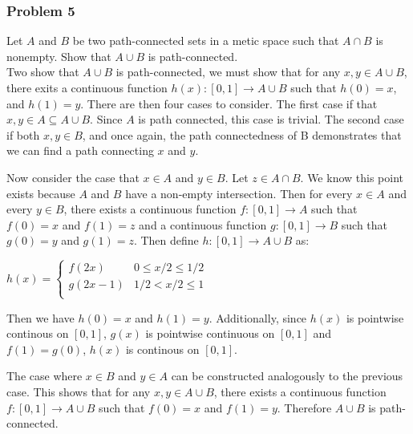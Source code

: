 \documentclass[10pt,a4paper]{article}
\begin{document}
\subsubsection{Problem 5}
Let $A$ and $B$ be two path-connected sets in a metic space such that $A \cap B$ is nonempty. Show that $A \cup B$ is path-connected.\\

Two show that $A \cup B$ is path-connected, we must show that for any $x, y \in A \cup B$, there exits a continuous function $h(x): [0, 1] \rightarrow A \cup B$ such that $h(0) = x$, and $h(1) = y$. There are then four cases to consider. The first case if that $x, y \in A \subseteq A \cup B$. Since $A$ is path connected, this case is trivial. The second case if both $x, y \in B$, and once again, the path connectedness of B demonstrates that we can find a path connecting $x$ and $y$.

Now consider the case that $x \in A$ and $y \in B$. Let $z \in A \cap B$. We know this point exists because $A$ and $B$ have a non-empty intersection. Then for every $x \in A$ and every $y \in B$, there exists a continuous function $f: [0, 1] \rightarrow A$ such that $f(0) = x$ and $f(1) = z$ and a continuous function $g: [0, 1] \rightarrow B$ such that $g(0) = y$ and $g(1) = z$. Then define $h : [0, 1] \rightarrow A \cup B$ as:\\


\centerline{$h(x) = \begin{cases} 
      f(2x) & 0 \leq x/2 \leq 1/2\\
      g(2x - 1) & 1/2 < x/2 \leq 1\\ 
   \end{cases}$}
\vspace{1pc}
Then we have $h(0) = x$ and $h(1) = y$. Additionally, since $h(x)$ is pointwise continous on $[0, 1]$, $g(x)$ is pointwise continuous on $[0, 1]$ and $f(1) = g(0)$, $h(x)$ is continous on $[0, 1]$.

The case where $x \in B$ and $y \in A$ can be constructed analogously to the previous case. This shows that for any $x, y \in A \cup B$, there exists a continuous function $f: [0, 1] \rightarrow A \cup B$ such that $f(0) = x$ and $f(1) = y$. Therefore $A \cup B$ is path-connected. 
\end{document}
